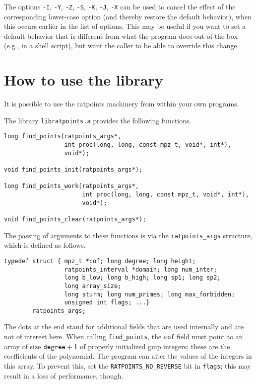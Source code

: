 \documentclass[12pt,a4paper,oneside]{amsart}
\begin{document}
The options \verb+-I+, \verb+-Y+, \verb+-Z+, \verb+-S+, \verb+-K+, \verb+-J+,
\verb+-X+ can be used to cancel the effect of the corresponding lower-case
option (and thereby restore the default behavior),
when this occurs earlier in the list of options. This may be useful if
you want to set a default behavior that is different from what the
program does out-of-the-box (e.g., in a shell script), but want the caller
to be able to override this change.


\section{How to use the library}

It is possible to use the ratpoints machinery from within your own programs.

The library \texttt{libratpoints.a} provides the following functions.

\begin{verbatim}
long find_points(ratpoints_args*,
                 int proc(long, long, const mpz_t, void*, int*),
                 void*);

void find_points_init(ratpoints_args*);

long find_points_work(ratpoints_args*,
                      int proc(long, long, const mpz_t, void*, int*),
                      void*);

void find_points_clear(ratpoints_args*);
\end{verbatim}

The passing of arguments to these functions is via the \texttt{ratpoints\_args}
structure, which is defined as follows.

\begin{verbatim}
typedef struct { mpz_t *cof; long degree; long height;
                 ratpoints_interval *domain; long num_inter;
                 long b_low; long b_high; long sp1; long sp2;
                 long array_size;
                 long sturm; long num_primes; long max_forbidden;
                 unsigned int flags; ...}
        ratpoints_args;
\end{verbatim}

The dots at the end stand for additional fields that are used internally
and are not of interest here. When calling \texttt{find\_points}, the
\texttt{cof} field must point to an array of size $\text{\texttt{degree}} + 1$
of properly initialized gmp integers; these are the coefficients of
the polynomial. The program can alter the values of the integers in this
array. To prevent this, set the \texttt{RATPOINTS\_NO\_REVERSE} bit
in \texttt{flags}; this may result in a loss of performance, though.
\end{document}
